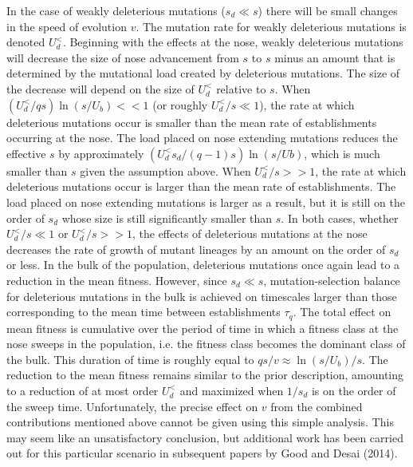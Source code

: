 \documentclass[12pt, one column]{article}
\begin{document}
In the case of weakly deleterious mutations ($s_d \ll s$) there will be small changes in the speed of evolution $v$.  The mutation rate for weakly deleterious mutations is denoted $U_d^{<}$.  Beginning with the effects at the nose, weakly deleterious mutations will decrease the size of nose advancement from $s$ to $s$ minus an amount that is determined by the mutational load created by deleterious mutations.  The size of the decrease will depend on the size of $U_d^{<}$ relative to $s$.  When $(U_d^{<} / qs)\ln(s/U_b) <<1$ (or roughly $U_d^{<}/s \ll 1$), the rate at which deleterious mutations occur is smaller than the mean rate of establishments occurring at the nose.  The load placed on nose extending mutations reduces the effective $s$ by approximately $(U_d^{<} s_d /(q-1)s)\ln(s/Ub)$, which is much smaller than $s$ given the assumption above.  When $U_d^{<} / s >> 1 $, the rate at which deleterious mutations occur is larger than the mean rate of establishments.  The load placed on nose extending mutations is larger as a result, but it is still on the order of $s_d$ whose size is still significantly smaller than $s$.  In both cases, whether $U_d^{<}/s \ll 1$ or $U_d^{<}/s >> 1$, the effects of deleterious mutations at the nose decreases the rate of growth of mutant lineages by an amount on the order of $s_d$ or less.  In the bulk of the population, deleterious mutations once again lead to a reduction in the mean fitness.  However, since $s_d \ll s$, mutation-selection balance for deleterious mutations in the bulk is achieved on timescales larger than those corresponding to the mean time between establishments $\tau_q$.  The total effect on mean fitness is cumulative over the period of time in which a fitness class at the nose sweeps in the population, i.e. the fitness class becomes the dominant class of the bulk.  This duration of time is roughly equal to $qs/v \approx \ln(s/U_b)/s$.  The reduction to the mean fitness remains similar to the prior description, amounting to a reduction of at most order $U_d^{<}$ and maximized when $1/s_d$ is on the order of the sweep time.  Unfortunately, the precise effect on $v$ from the combined contributions mentioned above cannot be given using this simple analysis.  This may seem like an unsatisfactory conclusion, but additional work has been carried out for this particular scenario in subsequent papers by Good and Desai (2014).
\end{document}
